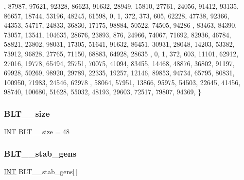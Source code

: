 \begin{DoxyCode}
      , 87987, 97621, 92328, 86623, 91632, 28949, 15810, 27761, 24056, 91412, 93135, 86657, 18744, 53196, 48245, 
      61598, 
    0, 1, 372, 373, 605, 62228, 47738, 92366, 44353, 54717, 24833, 36830, 17175, 98884, 50522, 74505, 94286
      , 83463, 84390, 73057, 13541, 104635, 28676, 23893, 876, 24966, 74067, 71692, 82936, 46784, 58821, 23802, 
      98031, 17305, 51641, 91632, 86451, 30931, 28048, 14203, 53382, 73912, 96828, 27765, 71150, 68883, 64928, 28635
      , 
    0, 1, 372, 603, 11101, 62912, 27016, 19778, 65494, 25751, 70075, 41094, 83455, 14468, 48876, 36802, 
      91197, 69928, 50269, 98920, 29789, 22335, 19257, 12146, 89853, 94734, 65795, 80831, 100950, 71983, 24546, 62978
      , 58064, 57951, 13866, 95975, 54503, 22645, 41456, 98740, 100680, 51628, 55032, 48193, 29603, 72517, 79807, 
      94369, 
\}
\end{DoxyCode}
\mbox{\label{data___b_l_t_8_c_aa7ab36b57b8e3435a3be3622f7d8d4e8}} 
\subsubsection{\texorpdfstring{B\+L\+T\+\_\+\_\+size}{BLT\_47\_size}}
{\footnotesize\ttfamily \mbox{\hyperlink{galois_8h_a09fddde158a3a20bd2dcadb609de11dc}{I\+NT}} B\+L\+T\+\_\+\_\+size = 48}

\mbox{\label{data___b_l_t_8_c_ad0a584f9d990dde867937e68410a9b47}} 
\subsubsection{\texorpdfstring{B\+L\+T\+\_\+\_\+stab\+\_\+gens}{BLT\_47\_stab\_gens}}
{\footnotesize\ttfamily \mbox{\hyperlink{galois_8h_a09fddde158a3a20bd2dcadb609de11dc}{I\+NT}} B\+L\+T\+\_\+\_\+stab\+\_\+gens\mbox{[}$\,$\mbox{]}}

\mbox{\label{data___b_l_t_8_c_a9b90501de86dace7b3e031957fb2c88b}} 
